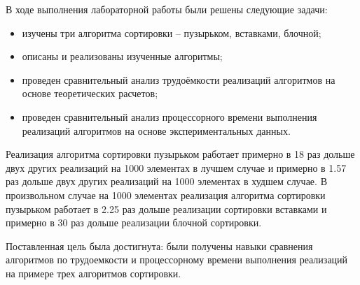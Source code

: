 
В ходе выполнения лабораторной работы были решены следующие задачи:

\begin{itemize}
	\item изучены три алгоритма сортировки -- пузырьком, вставками, блочной;
	\item описаны и реализованы изученные алгоритмы;
	\item проведен сравнительный анализ трудоёмкости реализаций алгоритмов на основе теоретических расчетов;
	\item проведен сравнительный анализ процессорного времени выполнения реализаций алгоритмов на основе экспериментальных данных.
\end{itemize}

Реализация алгоритма сортировки пузырьком работает примерно в 18 раз дольше двух других реализаций на 1000 элементах в лучшем случае и примерно в 1.57 раз дольше двух других реализаций на 1000 элементах в худшем случае.
В произвольном случае на 1000 элементах реализация алгоритма сортировки пузырьком работает в 2.25 раз дольше реализации сортировки вставками и примерно в 30 раз дольше реализации блочной сортировки.

Поставленная цель была достигнута: были получены навыки сравнения алгоритмов по трудоемкости и процессорному времени выполнения реализаций на примере трех алгоритмов сортировки.